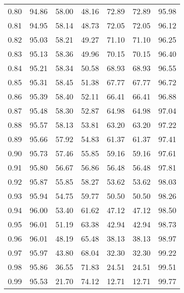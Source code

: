 \begin{tabular}{|c|c|c|c|c|c|c|}
      0.80 &     94.86 &     58.00 &      48.16 &   72.89 &      72.89 &         95.98 \\
      0.81 &     94.95 &     58.14 &      48.73 &   72.05 &      72.05 &         96.12 \\
      0.82 &     95.03 &     58.21 &      49.27 &   71.10 &      71.10 &         96.25 \\
      0.83 &     95.13 &     58.36 &      49.96 &   70.15 &      70.15 &         96.40 \\
      0.84 &     95.21 &     58.34 &      50.58 &   68.93 &      68.93 &         96.55 \\
      0.85 &     95.31 &     58.45 &      51.38 &   67.77 &      67.77 &         96.72 \\
      0.86 &     95.39 &     58.40 &      52.11 &   66.41 &      66.41 &         96.88 \\
      0.87 &     95.48 &     58.30 &      52.87 &   64.98 &      64.98 &         97.04 \\
      0.88 &     95.57 &     58.13 &      53.81 &   63.20 &      63.20 &         97.22 \\
      0.89 &     95.66 &     57.92 &      54.83 &   61.37 &      61.37 &         97.41 \\
      0.90 &     95.73 &     57.46 &      55.85 &   59.16 &      59.16 &         97.61 \\
      0.91 &     95.80 &     56.67 &      56.86 &   56.48 &      56.48 &         97.81 \\
      0.92 &     95.87 &     55.85 &      58.27 &   53.62 &      53.62 &         98.03 \\
      0.93 &     95.94 &     54.75 &      59.77 &   50.50 &      50.50 &         98.26 \\
      0.94 &     96.00 &     53.40 &      61.62 &   47.12 &      47.12 &         98.50 \\
      0.95 &     96.01 &     51.19 &      63.38 &   42.94 &      42.94 &         98.73 \\
      0.96 &     96.01 &     48.19 &      65.48 &   38.13 &      38.13 &         98.97 \\
      0.97 &     95.97 &     43.80 &      68.04 &   32.30 &      32.30 &         99.22 \\
      0.98 &     95.86 &     36.55 &      71.83 &   24.51 &      24.51 &         99.51 \\
      0.99 &     95.53 &     21.70 &      74.12 &   12.71 &      12.71 &         99.77 \\
\bottomrule
\end{tabular}
